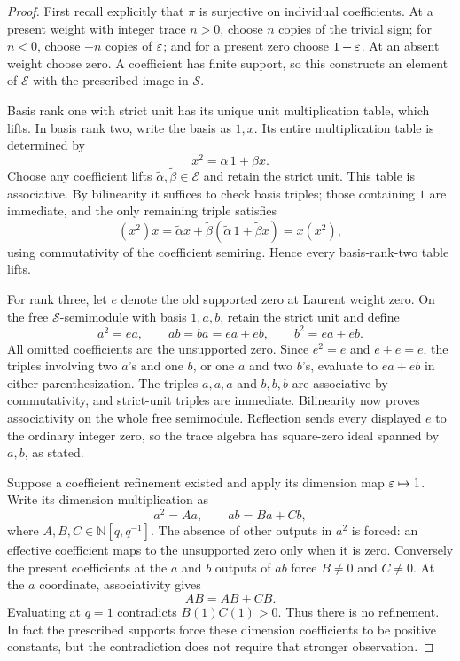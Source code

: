\begin{proof}
First recall explicitly that $\pi$ is surjective on individual coefficients. At a present weight with integer trace $n>0$, choose $n$ copies of the trivial sign; for $n<0$, choose $-n$ copies of $\varepsilon$; and for a present zero choose $1+\varepsilon$. At an absent weight choose zero. A coefficient has finite support, so this constructs an element of $\mathcal E$ with the prescribed image in $\mathcal S$.

Basis rank one with strict unit has its unique unit multiplication table, which lifts. In basis rank two, write the basis as $1,x$. Its entire multiplication table is determined by
\[
 x^2=\alpha\,1+\beta x.
\]
Choose any coefficient lifts $\widetilde\alpha,\widetilde\beta\in\mathcal E$ and retain the strict unit. This table is associative. By bilinearity it suffices to check basis triples; those containing $1$ are immediate, and the only remaining triple satisfies
\[
 (x^2)x=\widetilde\alpha x+
 \widetilde\beta(\widetilde\alpha\,1+\widetilde\beta x)
 =x(x^2),
\]
using commutativity of the coefficient semiring. Hence every basis-rank-two table lifts.

For rank three, let $e$ denote the old supported zero at Laurent weight zero. On the free $\mathcal S$-semimodule with basis $1,a,b$, retain the strict unit and define
\[
 a^2=e a,\qquad ab=ba=e a+e b,\qquad b^2=e a+e b.
\]
All omitted coefficients are the unsupported zero. Since $e^2=e$ and $e+e=e$, the triples involving two $a$'s and one $b$, or one $a$ and two $b$'s, evaluate to $e a+e b$ in either parenthesization. The triples $a,a,a$ and $b,b,b$ are associative by commutativity, and strict-unit triples are immediate. Bilinearity now proves associativity on the whole free semimodule. Reflection sends every displayed $e$ to the ordinary integer zero, so the trace algebra has square-zero ideal spanned by $a,b$, as stated.

Suppose a coefficient refinement existed and apply its dimension map $\varepsilon\mapsto1$. Write its dimension multiplication as
\[
 a^2=Aa,\qquad ab=Ba+Cb,
\]
where $A,B,C\in\mathbb N[q,q^{-1}]$. The absence of other outputs in $a^2$ is forced: an effective coefficient maps to the unsupported zero only when it is zero. Conversely the present coefficients at the $a$ and $b$ outputs of $ab$ force $B\ne0$ and $C\ne0$. At the $a$ coordinate, associativity gives
\[
 AB=AB+CB.
\]
Evaluating at $q=1$ contradicts $B(1)C(1)>0$. Thus there is no refinement. In fact the prescribed supports force these dimension coefficients to be positive constants, but the contradiction does not require that stronger observation.
\end{proof}
